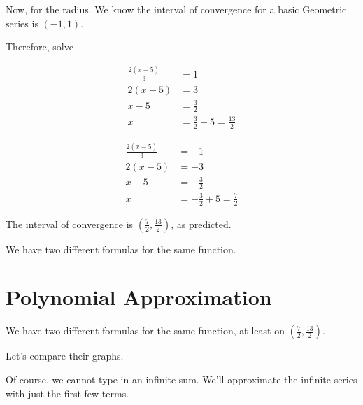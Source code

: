 \documentclass{ximera}
\begin{document}
\begin{example}
\begin{explanation}
Now, for the radius.  We know the interval of convergence for a basic Geometric series is $(-1, 1)$.


Therefore, solve



\begin{align*}
\frac{2(x-5)}{3} & = 1   \\
2(x-5) & = 3    \\
x-5 & = \frac{3}{2}    \\
x & = \frac{3}{2}  + 5 = \frac{13}{2}
\end{align*}




\begin{align*}
\frac{2(x-5)}{3} & = -1   \\
2(x-5) & = -3    \\
x-5 & = -\frac{3}{2}    \\
x & = -\frac{3}{2}  + 5 = \frac{7}{2}
\end{align*}




The interval of convergence is $\left( \frac{7}{2}, \frac{13}{2}\right)$, as predicted.



\end{explanation}

\end{example}


We have two different formulas for the same function.






















\section{Polynomial Approximation}


We have two different formulas for the same function, at least on $\left( \frac{7}{2}, \frac{13}{2}\right)$.


Let's compare their graphs.

Of course, we cannot type in an infinite sum.  We'll approximate the infinite series with just the first few terms.
\end{document}
